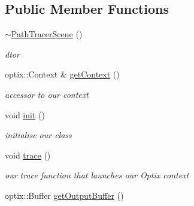 \subsection*{Public Member Functions}
\begin{DoxyCompactItemize}
\item 
\hypertarget{class_path_tracer_scene_a9f08902a26a5563b62df07f427cd656a}{\hyperlink{class_path_tracer_scene_a9f08902a26a5563b62df07f427cd656a}{$\sim$\-Path\-Tracer\-Scene} ()}\label{class_path_tracer_scene_a9f08902a26a5563b62df07f427cd656a}

\begin{DoxyCompactList}\small\item\em dtor \end{DoxyCompactList}\item 
\hypertarget{class_path_tracer_scene_acf716516054d2afead58edc76c65f609}{optix\-::\-Context \& \hyperlink{class_path_tracer_scene_acf716516054d2afead58edc76c65f609}{get\-Context} ()}\label{class_path_tracer_scene_acf716516054d2afead58edc76c65f609}

\begin{DoxyCompactList}\small\item\em accessor to our context \end{DoxyCompactList}\item 
\hypertarget{class_path_tracer_scene_a4daa09a33eeb4dfbbf7b736ac2626732}{void \hyperlink{class_path_tracer_scene_a4daa09a33eeb4dfbbf7b736ac2626732}{init} ()}\label{class_path_tracer_scene_a4daa09a33eeb4dfbbf7b736ac2626732}

\begin{DoxyCompactList}\small\item\em initialise our class \end{DoxyCompactList}\item 
\hypertarget{class_path_tracer_scene_af1617b7ddb8ea3eeadc2f6a45be74e04}{void \hyperlink{class_path_tracer_scene_af1617b7ddb8ea3eeadc2f6a45be74e04}{trace} ()}\label{class_path_tracer_scene_af1617b7ddb8ea3eeadc2f6a45be74e04}

\begin{DoxyCompactList}\small\item\em our trace function that launches our Optix context \end{DoxyCompactList}\item 
\hypertarget{class_path_tracer_scene_a679a405721ffcb67bd4b7d2152e0f539}{optix\-::\-Buffer \hyperlink{class_path_tracer_scene_a679a405721ffcb67bd4b7d2152e0f539}{get\-Output\-Buffer} ()}\label{class_path_tracer_scene_a679a405721ffcb67bd4b7d2152e0f539}


\end{DoxyCompactItemize}
